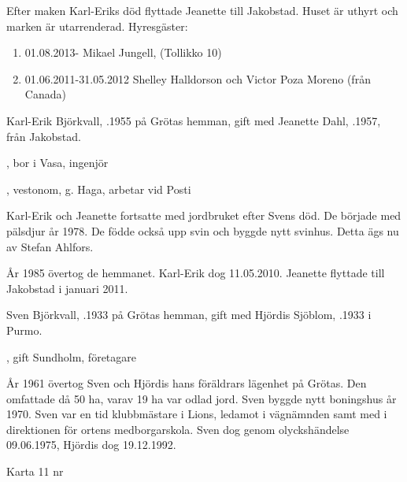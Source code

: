 Efter maken Karl-Eriks död flyttade Jeanette till Jakobstad. Huset är uthyrt och marken är utarrenderad.
Hyresgäster:
\begin{enumerate}
  \item 01.08.2013-   Mikael Jungell,  (Tollikko 10)
  \item 01.06.2011-31.05.2012  Shelley Halldorson och Victor Poza Moreno (från Canada)
\end{enumerate}


Karl-Erik Björkvall, .1955 på Grötas hemman, gift med Jeanette Dahl, .1957, från Jakobstad.
\begin{jhchildren}
  \item {}, bor i Vasa, ingenjör
  \item {}, vestonom, g. Haga, arbetar vid Posti
\end{jhchildren}


Karl-Erik och Jeanette fortsatte med  jordbruket efter Svens död. De började med pälsdjur år 1978. De födde också upp svin och byggde nytt svinhus. Detta ägs nu av Stefan Ahlfors.

År 1985 övertog de hemmanet. Karl-Erik dog 11.05.2010. Jeanette flyttade till Jakobstad i januari 2011.


Sven Björkvall, .1933 på Grötas hemman, gift med Hjördis Sjöblom, .1933 i Purmo.
\begin{jhchildren}
  \item {}
  \item {}, gift Sundholm, företagare
\end{jhchildren}
År 1961 övertog Sven och Hjördis hans föräldrars lägenhet på Grötas. Den omfattade då 50 ha, varav 19 ha var odlad jord. Sven byggde nytt boningshus år 1970. Sven var en tid klubbmästare i Lions, ledamot i vägnämnden samt med i direktionen för ortens medborgarskola. Sven dog genom olyckshändelse 09.06.1975, Hjördis dog 19.12.1992.


 Karta 11 nr 


